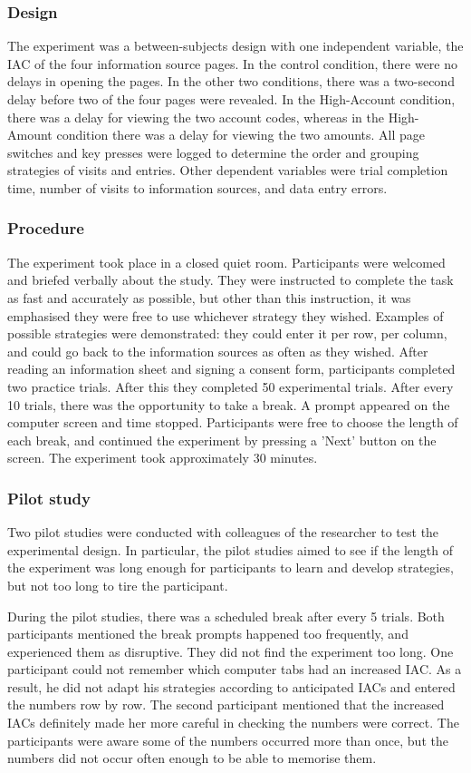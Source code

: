 \begin{table}
\begin{itemize}
\subsubsection{Design}
The experiment was a between-subjects design with one independent variable, the IAC of the four information source pages. In the control condition, there were no delays in opening the pages. In the other two conditions, there was a two-second delay before two of the four pages were revealed. In the High-Account condition, there was a delay for viewing the two account codes, whereas in the High-Amount condition there was a delay for viewing the two amounts. All page switches and key presses were logged to determine the order and grouping strategies of visits and entries. Other dependent variables were trial completion time, number of visits to information sources, and data entry errors.

\subsubsection{Procedure}
The experiment took place in a closed quiet room. Participants were welcomed and briefed verbally about the study. They were instructed to complete the task as fast and accurately as possible, but other than this instruction, it was emphasised they were free to use whichever strategy they wished. Examples of possible strategies were demonstrated: they could enter it per row, per column, and could go back to the information sources as often as they wished. After reading an information sheet and signing a consent form, participants completed two practice trials. After this they completed 50 experimental trials. After every 10 trials, there was the opportunity to take a break. A prompt appeared on the computer screen and time stopped. Participants were free to choose the length of each break, and continued the experiment by pressing a 'Next' button on the screen. The experiment took approximately 30 minutes.

\subsubsection{Pilot study}
Two pilot studies were conducted with colleagues of the researcher to test the experimental design. In particular, the pilot studies aimed to see if the length of the experiment was long enough for participants to learn and develop  strategies, but not too long to tire the participant.

During the pilot studies, there was a scheduled break after every 5 trials. Both participants mentioned the break prompts happened too frequently, and experienced them as disruptive. They did not find the experiment too long. One participant could not remember which computer tabs had an increased IAC. As a result, he did not adapt his strategies according to anticipated IACs and entered the numbers row by row. The second participant mentioned that the increased IACs definitely made her more careful in checking the numbers were correct. The participants were aware some of the numbers occurred more than once, but the numbers did not occur often enough to be able to memorise them. 


\end{itemize}
\end{table}
